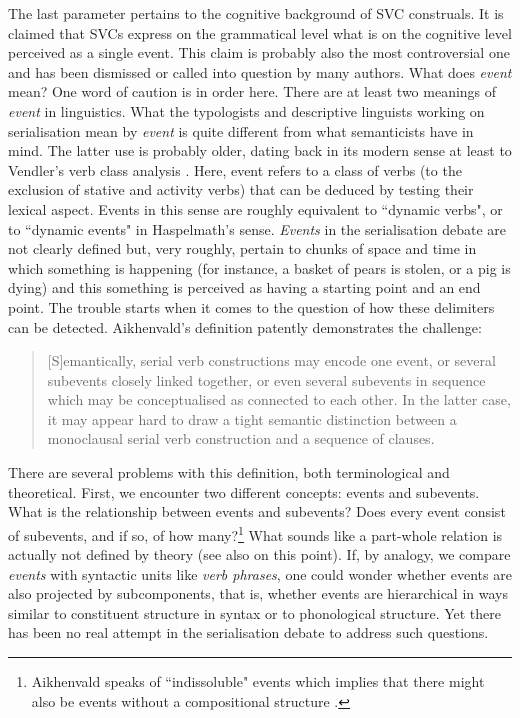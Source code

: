 The last parameter pertains to the cognitive background of SVC construals. It is claimed that SVCs express on the grammatical level what is on the cognitive level perceived as a single event. This claim is probably also the most controversial one and has been dismissed or called into question by many authors. What does \textit{event} mean? One word of caution is in order here. There are at least two meanings of \textit{event} in linguistics. What the typologists and descriptive linguists working on serialisation mean by \textit{event} is quite different from what semanticists have in mind. The latter use is probably older, dating back in its modern sense at least to Vendler's verb class analysis \citep{vendler1957verbs}. Here, event refers to a class of verbs (to the exclusion of stative and activity verbs) that can be deduced by testing their lexical aspect. Events in this sense are roughly equivalent to ``dynamic verbs", or to ``dynamic events" in Haspelmath's \citep{haspelmath2016serial} sense. \textit{Events} in the serialisation debate are not clearly defined but, very roughly, pertain to chunks of space and time in which something is happening (for instance, a basket of pears is stolen, or a pig is dying) and this something is perceived as having a starting point and an end point. The trouble starts when it comes to the question of how these delimiters can be detected. Aikhenvald's definition patently demonstrates the challenge:

\begin{quote}[S]emantically, serial verb constructions may encode one event, or several subevents closely linked together, or even several subevents in sequence which may be conceptualised as connected to each other. In the latter case, it may appear hard to draw a tight semantic distinction between a monoclausal serial verb construction and a sequence of clauses. \citep[12]{Aikhenvald2006}\end{quote} 

There are several problems with this definition, both terminological and theoretical. First, we encounter two different concepts: events and subevents. What is the relationship between events and subevents? Does every event consist of subevents, and if so, of how many?\footnote{Aikhenvald speaks of ``indissoluble" events which implies that there might also be events without a compositional structure \citep[12]{Aikhenvald2006}.} What sounds like a part-whole relation is actually not defined by theory (see also \citealt[499]{bohnemeyer2007principles} on this point). If, by analogy, we compare \textit{events} with syntactic units like \textit{verb phrases}, one could wonder whether events are also projected by subcomponents, that is, whether events are hierarchical in ways similar to constituent structure in syntax or to phonological structure. Yet there has been no real attempt in the serialisation debate to address such questions. 

